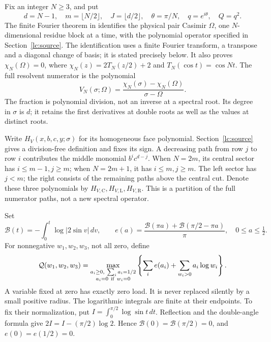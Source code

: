 Fix an integer \(N\ge3\), and put
\[
 d=N-1,\quad m=\lfloor N/2\rfloor,\quad J=\lfloor d/2\rfloor,\quad
 \theta=\pi/N,\quad q=e^{i\theta},\quad Q=q^2.
\]
The finite Fourier theorem in \cite[Proposition 4.1 and
equations (4.4)--(4.5)]{FinitePaper} identifies the physical pair Casimir
\(\Omega\), one \(N\)-dimensional residue block at a time, with the
polynomial operator specified in Section~\ref{lc:source}. The identification
uses a finite Fourier transform, a transpose and a diagonal change of basis;
it is stated precisely below. It also proves \(\chi_N(\Omega)=0\), where
\(\chi_N(z)=2T_N(z/2)+2\) and \(T_N(\cos t)=\cos Nt\).
The full resolvent numerator is the polynomial
\[
 V_N(\sigma;\Omega)
       =\frac{\chi_N(\sigma)-\chi_N(\Omega)}{\sigma-\Omega}.
\]
The fraction is polynomial division, not an inverse at a spectral root.
Its degree in \(\sigma\) is \(d\); it retains the first derivatives at
double roots as well as the values at distinct roots.

Write \(H_V(x,b,c,y;\sigma)\) for its homogeneous face polynomial.
Section~\ref{lc:source} gives a division-free definition and fixes its
sign. A decreasing path from row \(j\) to row \(i\) contributes the
middle monomial \(b^ic^{d-j}\). When \(N=2m\), its central sector
has \(i\le m-1,j\ge m\); when \(N=2m+1\), it has \(i\le m,j\ge m\).
The left sector has \(j<m\); the right consists of the remaining
paths above the central cut. Denote these three polynomials by
\(H_{V,\mathrm C},H_{V,\mathrm L},H_{V,\mathrm R}\).
This is a partition of the full numerator paths, not a new spectral
operator.

Set
\[
 \mathcal B(t)=-\int_0^t\log|2\sin v|\,dv,\qquad
 e(a)=\frac{\mathcal B(\pi a)+\mathcal B(\pi/2-\pi a)}{\pi},
 \quad 0\le a\le\tfrac12.
\]
For nonnegative \(w_1,w_2,w_3\), not all zero, define
\begin{equation}\label{lc:entropy}
 \mathcal Q(w_1,w_2,w_3)=
 \max_{\substack{a_i\ge0,\ \sum_i a_i=1/2\\a_i=0\ {\rm if}\ w_i=0}}
 \left\{\sum_i e(a_i)+\sum_{w_i>0}a_i\log w_i\right\}.
\end{equation}\aliascurrentequation{\label{sa:entropy}}
A variable fixed at zero has exactly zero load. It is never replaced
silently by a small positive radius. The logarithmic integrals are
finite at their endpoints. To fix their normalization, put
\(I=\int_0^{\pi/2}\log\sin t\,dt\). Reflection and the double-angle
formula give \(2I=I-(\pi/2)\log2\). Hence
\(\mathcal B(0)=\mathcal B(\pi/2)=0\), and \(e(0)=e(1/2)=0\).

